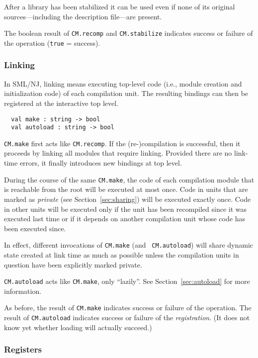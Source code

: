 \documentclass[titlepage,letterpaper]{article}
\begin{document}
After a library has been stabilized it can be used even if none of its
original sources---including the description file---are present.

The boolean result of {\tt CM.recomp} and {\tt CM.stabilize} indicates
success or failure of the operation ({\tt true} = success).

\subsubsection*{Linking}

In SML/NJ, linking means executing top-level code (i.e., module
creation and initialization code) of each compilation unit.  The
resulting bindings can then be registered at the interactive top
level.

\begin{verbatim}
  val make : string -> bool
  val autoload : string -> bool
\end{verbatim}

{\tt CM.make} first acts like {\tt CM.recomp}.  If the
(re-)compilation is successful, then it proceeds by linking all
modules that require linking.  Provided there are no link-time errors,
it finally introduces new bindings at top level.

During the course of the same {\tt CM.make}, the code of each
compilation module that is reachable from the root will be executed at
most once.  Code in units that are marked as {\it private} (see
Section~\ref{sec:sharing}) will be executed exactly once.  Code in
other units will be executed only if the unit has been recompiled
since it was executed last time or if it depends on another
compilation unit whose code has been executed since.

In effect, different invocations of {\tt CM.make} (and {\tt
CM.autoload}) will share dynamic state created at link time as much as
possible unless the compilation units in question have been explicitly
marked private.

{\tt CM.autoload} acts like {\tt CM.make}, only ``lazily''. See
Section~\ref{sec:autoload} for more information.

As before, the result of {\tt CM.make} indicates success or failure of
the operation.  The result of {\tt CM.autoload} indicates success or
failure of the {\em registration}.  (It does not know yet whether
loading will actually succeed.)

\subsubsection*{Registers}
\end{document}
